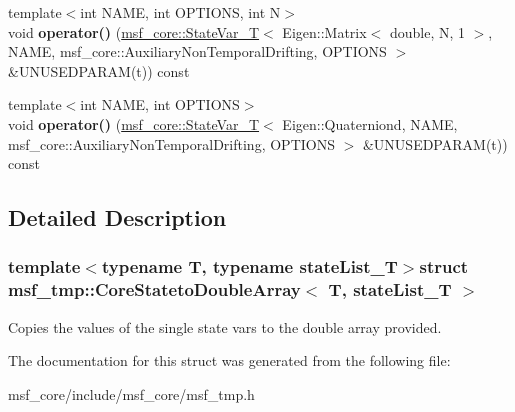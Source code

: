 \begin{DoxyCompactItemize}
\item 
\hypertarget{structmsf__tmp_1_1CoreStatetoDoubleArray_ad48356487380f3668e86f47532c831d8}{{\footnotesize template$<$int N\-A\-M\-E, int O\-P\-T\-I\-O\-N\-S, int N$>$ }\\void {\bfseries operator()} (\hyperlink{structmsf__core_1_1StateVar__T}{msf\-\_\-core\-::\-State\-Var\-\_\-\-T}$<$ Eigen\-::\-Matrix$<$ double, N, 1 $>$, N\-A\-M\-E, msf\-\_\-core\-::\-Auxiliary\-Non\-Temporal\-Drifting, O\-P\-T\-I\-O\-N\-S $>$ \&U\-N\-U\-S\-E\-D\-P\-A\-R\-A\-M(t)) const }\label{structmsf__tmp_1_1CoreStatetoDoubleArray_ad48356487380f3668e86f47532c831d8}

\item 
\hypertarget{structmsf__tmp_1_1CoreStatetoDoubleArray_a81363195a368b7336b48d45d40188402}{{\footnotesize template$<$int N\-A\-M\-E, int O\-P\-T\-I\-O\-N\-S$>$ }\\void {\bfseries operator()} (\hyperlink{structmsf__core_1_1StateVar__T}{msf\-\_\-core\-::\-State\-Var\-\_\-\-T}$<$ Eigen\-::\-Quaterniond, N\-A\-M\-E, msf\-\_\-core\-::\-Auxiliary\-Non\-Temporal\-Drifting, O\-P\-T\-I\-O\-N\-S $>$ \&U\-N\-U\-S\-E\-D\-P\-A\-R\-A\-M(t)) const }\label{structmsf__tmp_1_1CoreStatetoDoubleArray_a81363195a368b7336b48d45d40188402}

\end{DoxyCompactItemize}


\subsection{Detailed Description}
\subsubsection*{template$<$typename T, typename state\-List\-\_\-\-T$>$struct msf\-\_\-tmp\-::\-Core\-Stateto\-Double\-Array$<$ T, state\-List\-\_\-\-T $>$}

Copies the values of the single state vars to the double array provided. 

The documentation for this struct was generated from the following file\-:\begin{DoxyCompactItemize}
\item 
msf\-\_\-core/include/msf\-\_\-core/msf\-\_\-tmp.\-h\end{DoxyCompactItemize}
